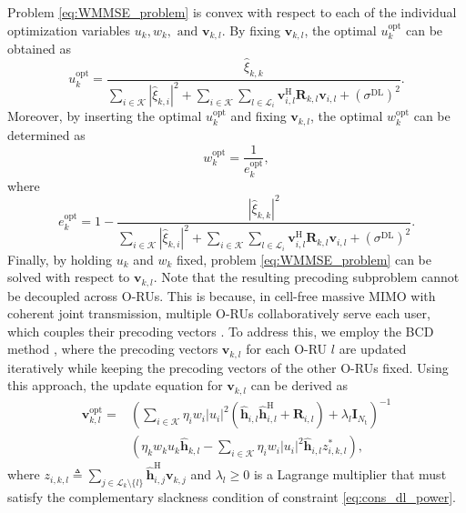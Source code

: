 \documentclass[10pt, conference]{IEEEtran}
\begin{document}
Problem \eqref{eq:WMMSE_problem} is convex with respect to each of the individual optimization variables $u_k, w_k, \textrm{ and } \mathbf{v}_{k,l}$.
By fixing $\mathbf{v}_{k,l}$, the optimal $u_k^\mathrm{opt}$ can be obtained as \cite{MIMO1}
\begin{equation}\label{eq:u_WMMSE}
    u_k^\mathrm{opt} = \frac{\hat{\xi}_{k,k}}{\sum_{i \in \mathcal{K}} \left|\hat{\xi}_{k,i}\right|^2 + 
    \sum\limits_{i \in \mathcal{K}} \sum\limits_{l\in \mathcal{L}_i}
    \mathbf{v}_{i,l}^\mathrm{H} \mathbf{R}_{k,l} \mathbf{v}_{i,l} + 
    \left(\sigma^{\mathrm{DL}}\right)^2
    }.
\end{equation}
Moreover, by inserting the optimal $u_k^\mathrm{opt}$ and fixing $\mathbf{v}_{k,l}$, the optimal $w_k^\mathrm{opt}$ can be determined as
\begin{equation}\label{eq:w_WMMSE}
    w_k^\mathrm{opt} = \frac{1}{e_k^\mathrm{opt}},
\end{equation}
where
\begin{equation}
    e_k^\mathrm{opt} = 1 - \frac{\left|\hat{\xi}_{k,k}\right|^2}{\sum_{i \in \mathcal{K}} \left|\hat{\xi}_{k,i}\right|^2 + 
    \sum\limits_{i \in \mathcal{K}} \sum\limits_{l\in \mathcal{L}_i}
    \mathbf{v}_{i,l}^\mathrm{H} \mathbf{R}_{k,l} \mathbf{v}_{i,l} + 
    \left(\sigma^{\mathrm{DL}}\right)^2
    }.
\end{equation}
Finally, by holding $u_k$ and $w_k$ fixed, problem \eqref{eq:WMMSE_problem} can be solved with respect to $\mathbf{v}_{k,l}$. Note that the resulting precoding subproblem cannot be decoupled across O-RUs. This is because, in cell-free massive MIMO with coherent joint transmission, multiple O-RUs collaboratively serve each user, which couples their precoding vectors \cite{MIMO:MHSH_TWC_2025}.
To address this, we employ the BCD method \cite{MIMO:MHSH_TWC_2025}, where the precoding vectors $\mathbf{v}_{k,l}$ for each O-RU $l$ are updated iteratively while keeping the precoding vectors of the other O-RUs fixed. Using this approach, the update equation for $\mathbf{v}_{k,l}$ can be derived as
\begin{align}\label{eq:V_WMMSE}
    \mathbf{v}_{k,l}^\mathrm{opt} = &\left(
    \sum_{i \in \mathcal{K}} \eta_i w_i |u_i|^2 \left(\hat{\mathbf{h}}_{i,l} \hat{\mathbf{h}}_{i,l}^\mathrm{H} + \mathbf{R}_{i,l}\right)
    + \lambda_l \mathbf{I}_{N_\mathrm{t}}
    \right)^{-1} \nonumber \\
    & \left(
    \eta_k w_k u_k \hat{\mathbf{h}}_{k,l} - \sum_{i \in \mathcal{K}} \eta_i w_i |u_i|^2 \hat{\mathbf{h}}_{i,l} z_{i,k,l}^* 
    \right),
\end{align}
where $z_{i,k,l} \triangleq \sum_{j \in \mathcal{L}_k \setminus\{l\}} \hat{\mathbf{h}}_{i,j}^\mathrm{H} \mathbf{v}_{k,j}$ and $\lambda_l \geq 0$ is a Lagrange multiplier that must satisfy the complementary slackness condition of constraint \eqref{eq:cons_dl_power}.
\end{document}
